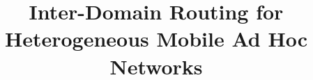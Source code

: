\documentclass{IEEEtran}
\begin{document}
\title{Inter-Domain Routing for Heterogeneous Mobile Ad Hoc Networks}


\maketitle
\begin{abstract}

\end{abstract}







%












\small{


}
\end{document}
